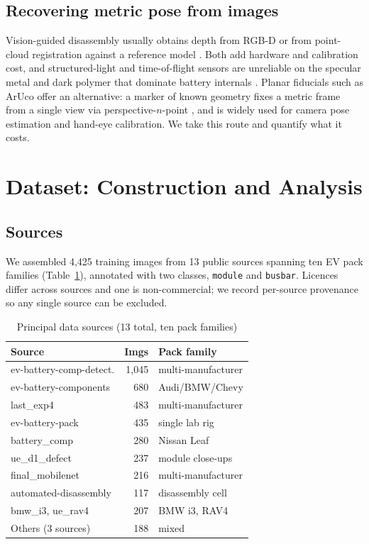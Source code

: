 \documentclass[conference]{IEEEtran}
\begin{document}
\subsection{Recovering metric pose from images}
Vision-guided disassembly usually obtains depth from RGB-D \cite{rapid2026} or from
point-cloud registration against a reference model \cite{cvmodule2023}. Both add
hardware and calibration cost, and structured-light and time-of-flight sensors are
unreliable on the specular metal and dark polymer that dominate battery internals
\cite{halmetschlager2019}. Planar fiducials such as ArUco \cite{aruco2014} offer an
alternative: a marker of known geometry fixes a metric frame from a single view via
perspective-$n$-point \cite{lepetit2009epnp}, and is widely used for camera pose
estimation and hand-eye calibration. We take this route and quantify what it costs.

\section{Dataset: Construction and Analysis}

\subsection{Sources}
We assembled 4,425 training images from 13 public sources spanning ten EV pack
families (Table~\ref{tab:sources}), annotated with two classes, \texttt{module} and
\texttt{busbar}. Licences differ across sources and one is non-commercial; we record
per-source provenance so any single source can be excluded.

\begin{table}[t]
\caption{Principal data sources (13 total, ten pack families)}
\label{tab:sources}
\centering
\small
\begin{tabular}{lrl}
\toprule
Source & Imgs & Pack family \\
\midrule
ev-battery-comp-detect. & 1,045 & multi-manufacturer \\
ev-battery-components & 680 & Audi/BMW/Chevy \\
last\_exp4 & 483 & multi-manufacturer \\
ev-battery-pack & 435 & single lab rig \\
battery\_comp & 280 & Nissan Leaf \\
ue\_d1\_defect & 237 & module close-ups \\
final\_mobilenet & 216 & multi-manufacturer \\
automated-disassembly & 117 & disassembly cell \\
bmw\_i3, ue\_rav4 & 207 & BMW i3, RAV4 \\
Others (3 sources) & 188 & mixed \\
\bottomrule
\end{tabular}
\end{table}
\end{document}
